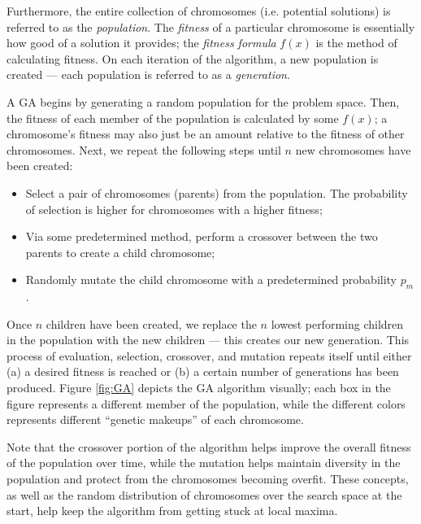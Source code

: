 Furthermore, the entire collection of chromosomes (i.e. potential solutions) is referred to as the \textit{population}.  The \textit{fitness} of a particular chromosome is essentially how good of a solution it provides; the \textit{fitness formula} $f(x)$ is the method of calculating fitness.  On each iteration of the algorithm, a new population is created --- each population is referred to as a \textit{generation}.

A GA begins by generating a random population for the problem space.  Then, the fitness of each member of the population is calculated by some $f(x)$; a chromosome's fitness may also just be an amount relative to the fitness of other chromosomes.  Next, we repeat the following steps until $n$ new chromosomes have been created:
\begin{itemize}
\item Select a pair of chromosomes (parents) from the population.  The probability of selection is higher for chromosomes with a higher fitness;
\item Via some predetermined method, perform a crossover between the two parents to create a child chromosome;
\item Randomly mutate the child chromosome with a predetermined probability $p_m$.
\end{itemize}

Once $n$ children have been created, we replace the $n$ lowest performing children in the population with the new children --- this creates our new generation.  This process of evaluation, selection, crossover, and mutation repeats itself until either (a) a desired fitness is reached or (b) a certain number of generations has been produced.  Figure \ref{fig:GA} depicts the GA algorithm visually; each box in the figure represents a different member of the population, while the different colors represents different ``genetic makeups'' of each chromosome.

Note that the crossover portion of the algorithm helps improve the overall fitness of the population over time, while the mutation helps maintain diversity in the population and protect from the chromosomes becoming overfit.  These concepts, as well as the random distribution of chromosomes over the search space  at the start, help keep the algorithm from getting stuck at local maxima.

